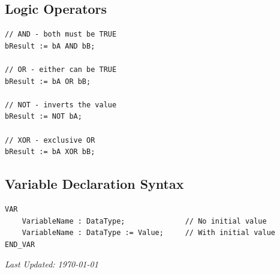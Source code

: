 \documentclass[11pt,a4paper]{article}
\begin{document}
\subsection*{Logic Operators}

\begin{lstlisting}
// AND - both must be TRUE
bResult := bA AND bB;

// OR - either can be TRUE  
bResult := bA OR bB;

// NOT - inverts the value
bResult := NOT bA;

// XOR - exclusive OR
bResult := bA XOR bB;
\end{lstlisting}

\subsection*{Variable Declaration Syntax}

\begin{lstlisting}
VAR
    VariableName : DataType;              // No initial value
    VariableName : DataType := Value;     // With initial value
END_VAR
\end{lstlisting}

\vfill

\begin{center}
\textit{Last Updated: \today}
\end{center}
\end{document}
